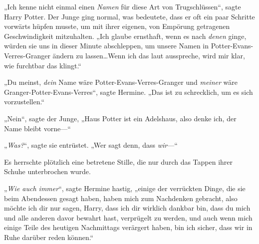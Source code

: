 „Ich kenne nicht einmal einen \emph{Namen} für diese Art von Trugschlüssen“, sagte Harry Potter. Der Junge ging normal, was bedeutete, dass er oft ein paar Schritte vorwärts hüpfen musste, um mit ihrer eigenen, von Empörung getragenen Geschwindigkeit mitzuhalten. „Ich glaube ernsthaft, wenn es nach \emph{denen} ginge, würden sie uns in dieser Minute abschleppen, um unsere Namen in Potter-Evans-Verres-Granger ändern zu lassen…Wenn ich das laut ausspreche, wird mir klar, wie furchtbar das klingt.“

„Du meinst, \emph{dein} Name wäre Potter-Evans-Verres-Granger und \emph{meiner} wäre Granger-Potter-Evans-Verres“, sagte Hermine. „Das ist zu schrecklich, um es sich vorzustellen.“

„Nein“, sagte der Junge, „Haus Potter ist ein Adelshaus, also denke ich, der Name bleibt vorne—“

„\emph{Was?}“, sagte sie entrüstet. „Wer sagt denn, dass \emph{wir}—“

Es herrschte plötzlich eine betretene Stille, die nur durch das Tappen ihrer Schuhe unterbrochen wurde.

„\emph{Wie auch immer}“, sagte Hermine hastig, „einige der verrückten Dinge, die sie beim Abendessen gesagt haben, haben mich zum Nachdenken gebracht, also möchte ich dir nur sagen, Harry, dass ich dir wirklich dankbar bin, dass du mich und alle anderen davor bewahrt hast, verprügelt zu werden, und auch wenn mich einige Teile des heutigen Nachmittags verärgert haben, bin ich sicher, dass wir in Ruhe darüber reden können.“


